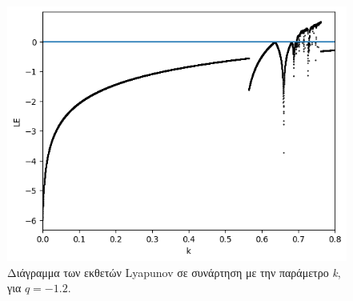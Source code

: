 \begin{figure}[ht]
	\centering
	\includegraphics[width=1\linewidth]{LateX images/graphs q12/g2}
	\caption{Διάγραμμα των εκθετών Lyapunov σε συνάρτηση με την παράμετρο \emph{k}, για $q=-1.2$.}
	\label{f:g17}
\end{figure}

